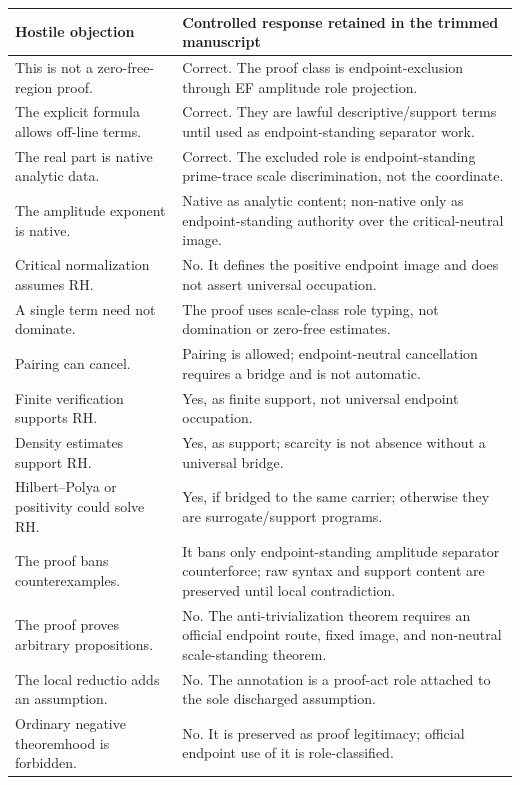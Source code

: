 \documentclass[11pt]{article}
\begin{document}
\begingroup\small
\begin{longtable}{L{0.33\textwidth}L{0.57\textwidth}}
\toprule
\textbf{Hostile objection} & \textbf{Controlled response retained in the trimmed manuscript}\\
\midrule
This is not a zero-free-region proof. & Correct.  The proof class is endpoint-exclusion through EF amplitude role projection.\\
The explicit formula allows off-line terms. & Correct.  They are lawful descriptive/support terms until used as endpoint-standing separator work.\\
The real part is native analytic data. & Correct.  The excluded role is endpoint-standing prime-trace scale discrimination, not the coordinate.\\
The amplitude exponent is native. & Native as analytic content; non-native only as endpoint-standing authority over the critical-neutral image.\\
Critical normalization assumes RH. & No.  It defines the positive endpoint image and does not assert universal occupation.\\
A single term need not dominate. & The proof uses scale-class role typing, not domination or zero-free estimates.\\
Pairing can cancel. & Pairing is allowed; endpoint-neutral cancellation requires a bridge and is not automatic.\\
Finite verification supports RH. & Yes, as finite support, not universal endpoint occupation.\\
Density estimates support RH. & Yes, as support; scarcity is not absence without a universal bridge.\\
Hilbert--Polya or positivity could solve RH. & Yes, if bridged to the same carrier; otherwise they are surrogate/support programs.\\
The proof bans counterexamples. & It bans only endpoint-standing amplitude separator counterforce; raw syntax and support content are preserved until local contradiction.\\
The proof proves arbitrary propositions. & No.  The anti-trivialization theorem requires an official endpoint route, fixed image, and non-neutral scale-standing theorem.\\
The local reductio adds an assumption. & No.  The annotation is a proof-act role attached to the sole discharged assumption.\\
Ordinary negative theoremhood is forbidden. & No.  It is preserved as proof legitimacy; official endpoint use of it is role-classified.\\

\end{longtable}
\end{document}
